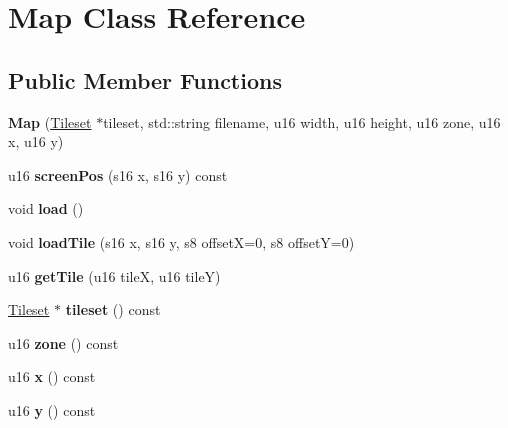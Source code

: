 \hypertarget{classMap}{\section{Map Class Reference}
\label{classMap}
}
\subsection*{Public Member Functions}
\begin{DoxyCompactItemize}
\item 
\hypertarget{classMap_a43109b24e3dbb3346e24f6f14de5c0b1}{{\bfseries Map} (\hyperlink{structTileset}{Tileset} $\ast$tileset, std\+::string filename, u16 width, u16 height, u16 zone, u16 x, u16 y)}\label{classMap_a43109b24e3dbb3346e24f6f14de5c0b1}

\item 
\hypertarget{classMap_a0c779ad064dcea5a8523962b3f0a3fd7}{u16 {\bfseries screen\+Pos} (s16 x, s16 y) const }\label{classMap_a0c779ad064dcea5a8523962b3f0a3fd7}

\item 
\hypertarget{classMap_a11fd1b88b5f3c923dad2c88df16e4373}{void {\bfseries load} ()}\label{classMap_a11fd1b88b5f3c923dad2c88df16e4373}

\item 
\hypertarget{classMap_a0c725b2b5aa05cbb6cd9555b9d40c4a9}{void {\bfseries load\+Tile} (s16 x, s16 y, s8 offset\+X=0, s8 offset\+Y=0)}\label{classMap_a0c725b2b5aa05cbb6cd9555b9d40c4a9}

\item 
\hypertarget{classMap_a6d1591e17d1d740102ea3d310b3bc691}{u16 {\bfseries get\+Tile} (u16 tile\+X, u16 tile\+Y)}\label{classMap_a6d1591e17d1d740102ea3d310b3bc691}

\item 
\hypertarget{classMap_a18f14d389c84ca7d8f75a0a31fdf35f7}{\hyperlink{structTileset}{Tileset} $\ast$ {\bfseries tileset} () const }\label{classMap_a18f14d389c84ca7d8f75a0a31fdf35f7}

\item 
\hypertarget{classMap_ab33fdb59d7aabee689251a8963410283}{u16 {\bfseries zone} () const }\label{classMap_ab33fdb59d7aabee689251a8963410283}

\item 
\hypertarget{classMap_a7427f72e828a67bd601ce3508d189fbe}{u16 {\bfseries x} () const }\label{classMap_a7427f72e828a67bd601ce3508d189fbe}

\item 
\hypertarget{classMap_a53215c2b905862830aab595fc09d63fb}{u16 {\bfseries y} () const }\label{classMap_a53215c2b905862830aab595fc09d63fb}

\end{DoxyCompactItemize}
